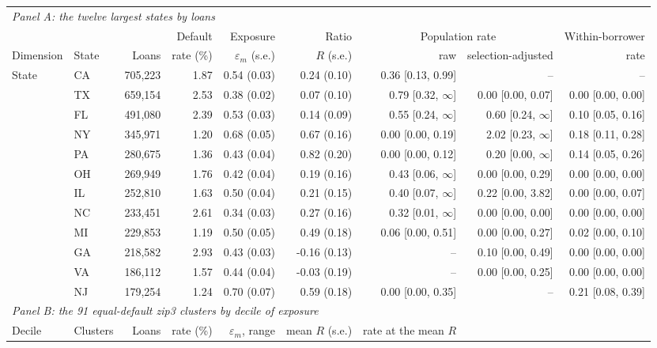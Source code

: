 \begin{tabular}{llrrrrrrr}
\toprule
\multicolumn{9}{l}{\textit{Panel A: the twelve largest states by loans}} \\
 & & & Default & Exposure & Ratio & \multicolumn{2}{c}{Population rate} & Within-borrower \\
\cmidrule(lr){7-8}
Dimension & State & Loans & rate (\%) & $\varepsilon_m$ (s.e.) & $R$ (s.e.) & raw & selection-adjusted & rate \\
\midrule
State & CA & 705,223 & 1.87 & 0.54 (0.03) & 0.24 (0.10) & 0.36 [0.13, 0.99] & -- & -- \\
 & TX & 659,154 & 2.53 & 0.38 (0.02) & 0.07 (0.10) & 0.79 [0.32, $\infty$] & 0.00 [0.00, 0.07] & 0.00 [0.00, 0.00] \\
 & FL & 491,080 & 2.39 & 0.53 (0.03) & 0.14 (0.09) & 0.55 [0.24, $\infty$] & 0.60 [0.24, $\infty$] & 0.10 [0.05, 0.16] \\
 & NY & 345,971 & 1.20 & 0.68 (0.05) & 0.67 (0.16) & 0.00 [0.00, 0.19] & 2.02 [0.23, $\infty$] & 0.18 [0.11, 0.28] \\
 & PA & 280,675 & 1.36 & 0.43 (0.04) & 0.82 (0.20) & 0.00 [0.00, 0.12] & 0.20 [0.00, $\infty$] & 0.14 [0.05, 0.26] \\
 & OH & 269,949 & 1.76 & 0.42 (0.04) & 0.19 (0.16) & 0.43 [0.06, $\infty$] & 0.00 [0.00, 0.29] & 0.00 [0.00, 0.00] \\
 & IL & 252,810 & 1.63 & 0.50 (0.04) & 0.21 (0.15) & 0.40 [0.07, $\infty$] & 0.22 [0.00, 3.82] & 0.00 [0.00, 0.07] \\
 & NC & 233,451 & 2.61 & 0.34 (0.03) & 0.27 (0.16) & 0.32 [0.01, $\infty$] & 0.00 [0.00, 0.00] & 0.00 [0.00, 0.00] \\
 & MI & 229,853 & 1.19 & 0.50 (0.05) & 0.49 (0.18) & 0.06 [0.00, 0.51] & 0.00 [0.00, 0.27] & 0.02 [0.00, 0.10] \\
 & GA & 218,582 & 2.93 & 0.43 (0.03) & -0.16 (0.13) & -- & 0.10 [0.00, 0.49] & 0.00 [0.00, 0.00] \\
 & VA & 186,112 & 1.57 & 0.44 (0.04) & -0.03 (0.19) & -- & 0.00 [0.00, 0.25] & 0.00 [0.00, 0.00] \\
 & NJ & 179,254 & 1.24 & 0.70 (0.07) & 0.59 (0.18) & 0.00 [0.00, 0.35] & -- & 0.21 [0.08, 0.39] \\
\midrule
\multicolumn{9}{l}{\textit{Panel B: the 91 equal-default zip3 clusters by decile of exposure}} \\
Decile & Clusters & Loans & rate (\%) & $\varepsilon_m$, range & mean $R$ (s.e.) & rate at the mean $R$ & & \\

\end{tabular}
